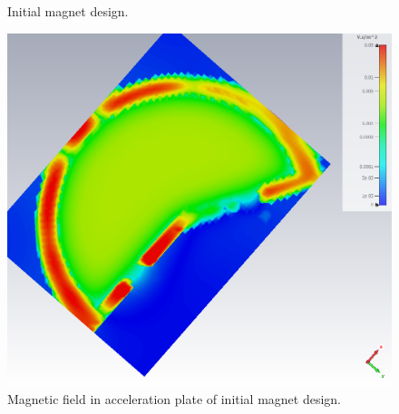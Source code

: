 \documentclass{article}
\begin{document}
\vspace{18pt}
\begin{figure}[H]
    \centering
    \qquad{}%
    \vspace{0pt}
    \caption{\centering Initial magnet design.} 
    \label{fig:initial_magnet_design}
\end{figure}

\begin{figure}[H]
    \centering
    \includegraphics[width=.7\linewidth]{../../../figures/cst/cst_first_magnet_design3.png}
    \vspace{0pt}
    \caption{Magnetic field in acceleration plate of initial magnet design.}
    \label{fig:initial_magnet_design_B}
    \vspace{-10pt}
\end{figure}
\end{document}
